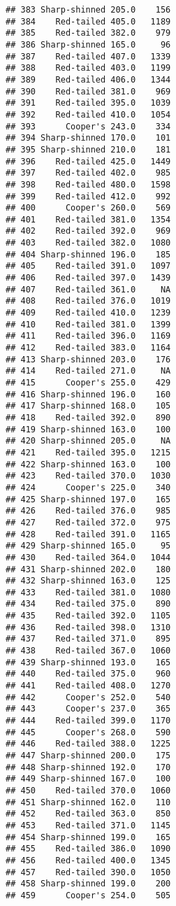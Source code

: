 \documentclass[
]{article}
\begin{document}
\begin{verbatim}
## 383 Sharp-shinned 205.0    156
## 384    Red-tailed 405.0   1189
## 385    Red-tailed 382.0    979
## 386 Sharp-shinned 165.0     96
## 387    Red-tailed 407.0   1339
## 388    Red-tailed 403.0   1199
## 389    Red-tailed 406.0   1344
## 390    Red-tailed 381.0    969
## 391    Red-tailed 395.0   1039
## 392    Red-tailed 410.0   1054
## 393      Cooper's 243.0    334
## 394 Sharp-shinned 170.0    101
## 395 Sharp-shinned 210.0    181
## 396    Red-tailed 425.0   1449
## 397    Red-tailed 402.0    985
## 398    Red-tailed 480.0   1598
## 399    Red-tailed 412.0    992
## 400      Cooper's 260.0    569
## 401    Red-tailed 381.0   1354
## 402    Red-tailed 392.0    969
## 403    Red-tailed 382.0   1080
## 404 Sharp-shinned 196.0    185
## 405    Red-tailed 391.0   1097
## 406    Red-tailed 397.0   1439
## 407    Red-tailed 361.0     NA
## 408    Red-tailed 376.0   1019
## 409    Red-tailed 410.0   1239
## 410    Red-tailed 381.0   1399
## 411    Red-tailed 396.0   1169
## 412    Red-tailed 383.0   1164
## 413 Sharp-shinned 203.0    176
## 414    Red-tailed 271.0     NA
## 415      Cooper's 255.0    429
## 416 Sharp-shinned 196.0    160
## 417 Sharp-shinned 168.0    105
## 418    Red-tailed 392.0    890
## 419 Sharp-shinned 163.0    100
## 420 Sharp-shinned 205.0     NA
## 421    Red-tailed 395.0   1215
## 422 Sharp-shinned 163.0    100
## 423    Red-tailed 370.0   1030
## 424      Cooper's 225.0    340
## 425 Sharp-shinned 197.0    165
## 426    Red-tailed 376.0    985
## 427    Red-tailed 372.0    975
## 428    Red-tailed 391.0   1165
## 429 Sharp-shinned 165.0     95
## 430    Red-tailed 364.0   1044
## 431 Sharp-shinned 202.0    180
## 432 Sharp-shinned 163.0    125
## 433    Red-tailed 381.0   1080
## 434    Red-tailed 375.0    890
## 435    Red-tailed 392.0   1105
## 436    Red-tailed 398.0   1310
## 437    Red-tailed 371.0    895
## 438    Red-tailed 367.0   1060
## 439 Sharp-shinned 193.0    165
## 440    Red-tailed 375.0    960
## 441    Red-tailed 408.0   1270
## 442      Cooper's 252.0    540
## 443      Cooper's 237.0    365
## 444    Red-tailed 399.0   1170
## 445      Cooper's 268.0    590
## 446    Red-tailed 388.0   1225
## 447 Sharp-shinned 200.0    175
## 448 Sharp-shinned 192.0    170
## 449 Sharp-shinned 167.0    100
## 450    Red-tailed 370.0   1060
## 451 Sharp-shinned 162.0    110
## 452    Red-tailed 363.0    850
## 453    Red-tailed 371.0   1145
## 454 Sharp-shinned 199.0    165
## 455    Red-tailed 386.0   1090
## 456    Red-tailed 400.0   1345
## 457    Red-tailed 390.0   1050
## 458 Sharp-shinned 199.0    200
## 459      Cooper's 254.0    505

\end{verbatim}
\end{document}
